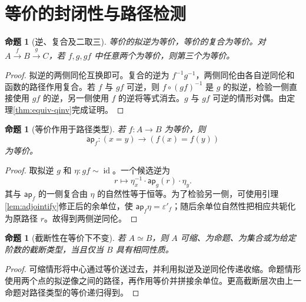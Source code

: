 \documentclass[12pt,oneside,openany,fontset=none]{ctexbook}
\theoremstyle{cn}
\newtheorem{proposition}[definition]{命题}
\numberwithin{equation}{chapter}
\newcommand{\id}{\operatorname{id}}
\newcommand{\ap}{\mathsf{ap}}
\begin{document}
\section{等价的封闭性与路径检测}
\begin{proposition}[逆、复合及二取三]
等价的拟逆为等价，等价的复合为等价。对 $A\xrightarrow fB\xrightarrow gC$，若 $f,g,gf$ 中任意两个为等价，则第三个为等价。
\end{proposition}
\begin{proof}
拟逆的两侧同伦互换即可。复合的逆为 $f^{-1}g^{-1}$，两侧同伦由各自逆同伦和函数的路径作用复合。若 $f$ 与 $gf$ 可逆，则 $f\circ(gf)^{-1}$ 是 $g$ 的拟逆，检验一侧直接使用 $gf$ 的逆，另一侧使用 $f$ 的逆将等式消去。$g$ 与 $gf$ 可逆的情形对偶。由定理\ref{thm:equiv-qinv}完成证明。
\end{proof}
\begin{proposition}[等价作用于路径类型]
若 $f:A\to B$ 为等价，则
\[
\ap_f:(x=y)\longrightarrow(f(x)=f(y))
\]
为等价。
\end{proposition}
\begin{proof}
取拟逆 $g$ 和 $\eta:gf\sim\id$。一个候选逆为
\[
r\longmapsto\eta_x^{-1}\cdot\ap_g(r)\cdot\eta_y.
\]
其与 $\ap_f$ 的一侧复合由 $\eta$ 的自然性等于恒等。为了检验另一侧，可使用引理\ref{lem:adjointify}修正后的余单位，使 $\ap_f\eta=\varepsilon'_f$；随后余单位自然性把相应共轭化为原路径 $r$。故得到两侧逆同伦。
\end{proof}
\begin{proposition}[截断性在等价下不变]
若 $A\simeq B$，则 $A$ 可缩、为命题、为集合或为给定阶数的截断类型，当且仅当 $B$ 具有相同性质。
\end{proposition}
\begin{proof}
可缩情形将中心通过等价送过去，并利用拟逆及逆同伦传递收缩。命题情形使用两个点的拟逆像之间的路径，再作用等价并拼接余单位。更高截断层次由上一命题对路径类型的等价递归得到。
\end{proof}
\end{document}
